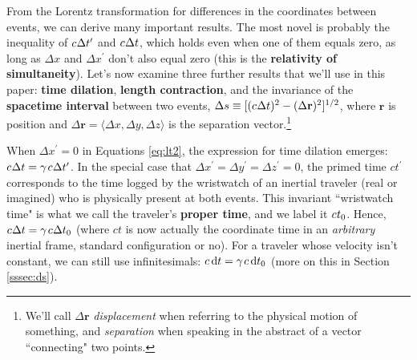 \documentclass[12pt]{article}
\renewcommand{\vv}[1]{\mathbf{#1}}
\newcommand{\dd}[1]{\mathrm{d}#1}
\begin{document}
From the Lorentz transformation for differences in the coordinates between events, we can derive many important results. The most novel is probably the inequality of $c \mkern.5mu \Delta t^{\prime}$ and $c \mkern.5mu \Delta t$, which holds even when one of them equals zero, as long as $\Delta x$ and $\Delta x^\prime$ don't also equal zero (this is the \textbf{relativity of simultaneity}). Let's now examine three further results that we'll use in this paper: \textbf{time dilation}, \textbf{length contraction}, and the invariance of the \textbf{spacetime interval} between two events, $\Delta s \equiv [(c \mkern.5mu \Delta t)^2 - ( \Delta \vv r )^2]^{1/2}$, where $\vv r$ is position and ${\Delta \vv r = \langle \Delta x, \Delta y, \Delta z \rangle}$ is the separation vector.\footnote{We'll call $\Delta \vv r$ \emph{displacement} when referring to the physical motion of something, and \emph{separation} when speaking in the abstract of a vector ``connecting" two points.}

When $\Delta x^{\prime} = 0$ in Equations \ref{eq:lt2}, the expression for time dilation emerges: $c \mkern.5mu \Delta t = \gamma \mkern2mu c \mkern.5mu \Delta t^{\prime}$. In the special case that $\Delta x^{\prime} = \Delta y^{\prime} = \Delta z^{\prime} = 0$, the primed time $ct^{\prime}$ corresponds to the time logged by the wristwatch of an inertial traveler (real or imagined) who is physically present at both events. This invariant ``wristwatch time" is what we call the traveler's \textbf{proper time}, and we label it $c \mkern.5mu t_0$. Hence, $c \mkern.5mu \Delta t = \gamma \mkern2mu c \mkern.5mu \Delta t_0$ (where $ct$ is now actually the coordinate time in an \emph{arbitrary} inertial frame, standard configuration or no). For a traveler whose velocity isn't constant, we can still use infinitesimals: $c \, \dd t = \gamma \mkern2mu c \, \dd t_0$ (more on this in Section \ref{sssec:ds}).
\end{document}
